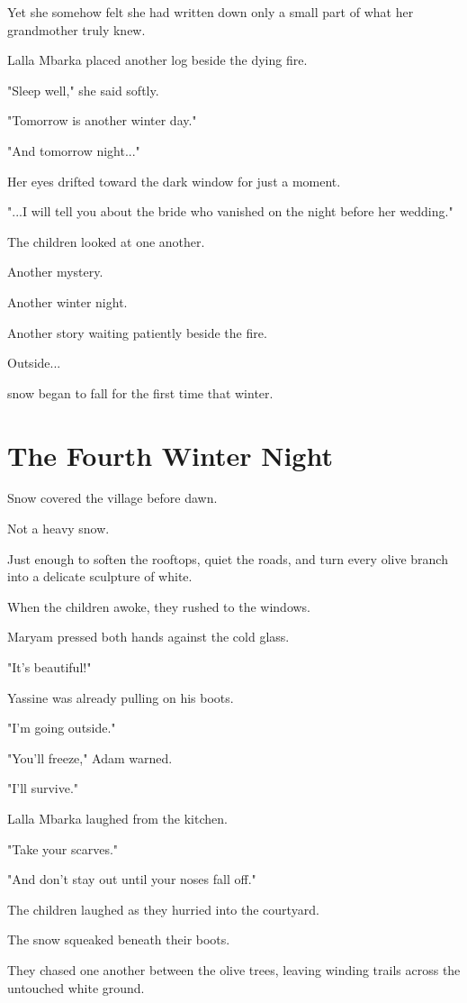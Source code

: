 \documentclass[12pt,openany]{book}
\begin{document}
Yet she somehow felt she had written down only a small part of what her grandmother truly knew.

Lalla Mbarka placed another log beside the dying fire.

"Sleep well," she said softly.

"Tomorrow is another winter day."

"And tomorrow night..."

Her eyes drifted toward the dark window for just a moment.

"...I will tell you about the bride who vanished on the night before her wedding."

The children looked at one another.

Another mystery.

Another winter night.

Another story waiting patiently beside the fire.

Outside...

snow began to fall for the first time that winter.
\chapter{The Fourth Winter Night}

Snow covered the village before dawn.

Not a heavy snow.

Just enough to soften the rooftops, quiet the roads, and turn every olive branch into a delicate sculpture of white.

When the children awoke, they rushed to the windows.

Maryam pressed both hands against the cold glass.

"It's beautiful!"

Yassine was already pulling on his boots.

"I'm going outside."

"You'll freeze," Adam warned.

"I'll survive."

Lalla Mbarka laughed from the kitchen.

"Take your scarves."

"And don't stay out until your noses fall off."

The children laughed as they hurried into the courtyard.

The snow squeaked beneath their boots.

They chased one another between the olive trees, leaving winding trails across the untouched white ground.
\end{document}
